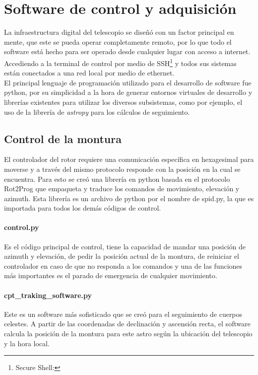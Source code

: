 \section{Software de control y adquisición} \label{sec:software}

La infraestructura digital del telescopio se diseñó con un factor principal en mente, que este se pueda operar completamente remoto, por lo que todo el software está hecho para ser operado desde cualquier lugar con acceso a internet. Accediendo a la terminal de control por medio de SSH\footnote{Secure Shell: } y todos sus sistemas están conectados a una red local por medio de ethernet.\\

El principal lenguaje de programación utilizado para el desarrollo de software fue python, por su simplicidad a la hora de generar entornos virtuales de desarrollo y librerías existentes para utilizar los diversos subsistemas, como por ejemplo, el uso de la librería de \textit{astropy} para los cálculos de seguimiento.\\

\subsection{Control de la montura}

El controlador del rotor requiere una comunicación específica en hexagesimal para moverse y a través del mismo protocolo responde con la posición en la cual se encuentra. Para esto se creó una librería en python basada en el protocolo Rot2Prog \cite{Rot2Prog} que empaqueta y traduce los comandos de movimiento, elevación y azimuth. Esta librería es un archivo de python por el nombre de spid.py, la que es importada para todos los demás códigos de control.\\

\paragraph{control.py} Es el código principal de control, tiene la capacidad de mandar una posición de azimuth y elevación, de pedir la posición actual de la montura, de reiniciar el controlador en caso de que no responda a los comandos y una de las funciones más importantes es el parado de emergencia de cualquier movimiento.\\

\paragraph{cpt\_traking\_software.py} Este es un software más sofisticado que se creó para el seguimiento de cuerpos celestes. A partir de las coordenadas de declinación y ascensión recta, el software calcula la posición de la montura para este astro según la ubicación del telescopio y la hora local.\\

